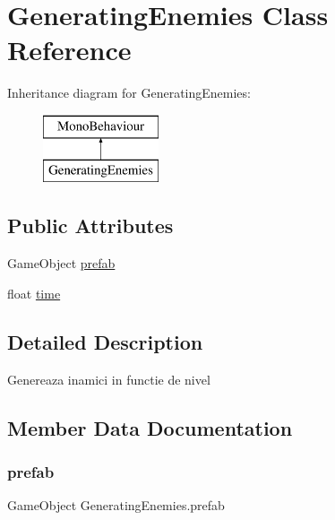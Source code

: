 \hypertarget{class_generating_enemies}{}\section{Generating\+Enemies Class Reference}
\label{class_generating_enemies}
Inheritance diagram for Generating\+Enemies\+:\begin{figure}[H]
\begin{center}
\leavevmode
\includegraphics[height=2.000000cm]{class_generating_enemies}
\end{center}
\end{figure}
\subsection*{Public Attributes}
\begin{DoxyCompactItemize}
\item 
Game\+Object \hyperlink{class_generating_enemies_ad1010803ac8fc15527679c7d6e544397}{prefab}
\item 
float \hyperlink{class_generating_enemies_a6e62912d45be356c13984ef19569879a}{time}
\end{DoxyCompactItemize}


\subsection{Detailed Description}
Genereaza inamici in functie de nivel 

\subsection{Member Data Documentation}
\mbox{\label{class_generating_enemies_ad1010803ac8fc15527679c7d6e544397}} 
\subsubsection{\texorpdfstring{prefab}{prefab}}
{\footnotesize\ttfamily Game\+Object Generating\+Enemies.\+prefab}

